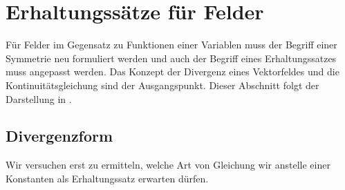 %
%
\section{Erhaltungssätze für Felder
\label{buch:symmetrien:felder}}
Für Felder im Gegensatz zu Funktionen einer Variablen muss der
Begriff einer Symmetrie neu formuliert werden und auch der Begriff
eines Erhaltungssatzes muss angepasst werden.
Das Konzept der Divergenz eines Vektorfeldes
und die Kontinuitätsgleichung sind der Ausgangspunkt.
Dieser Abschnitt folgt der Darstellung in \cite[section 8.6]{buch:pde}.

%
%
\subsection{Divergenzform}
Wir versuchen erst zu ermitteln, welche Art von Gleichung wir anstelle
einer Konstanten als Erhaltungssatz erwarten dürfen.

%
%
